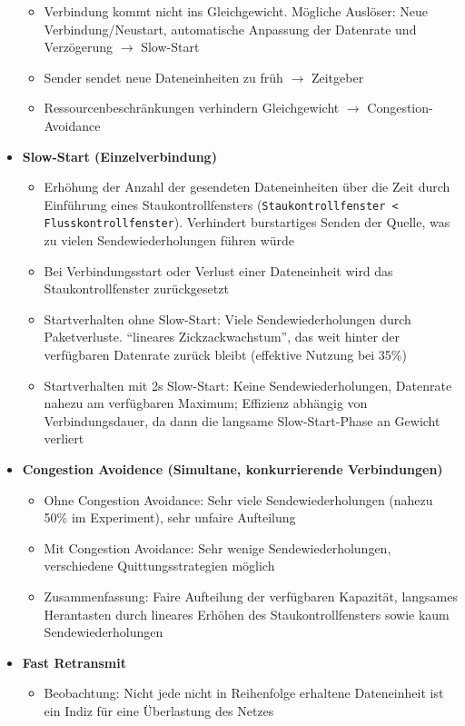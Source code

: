 \begin{itemize}
	\begin{itemize}
		\item Verbindung kommt nicht ins Gleichgewicht. Mögliche Auslöser: Neue Verbindung/Neustart, automatische Anpassung der Datenrate und Verzögerung \(\rightarrow\) Slow-Start
		\item Sender sendet neue Dateneinheiten zu früh \(\rightarrow\) Zeitgeber
		\item Ressourcenbeschränkungen verhindern Gleichgewicht \(\rightarrow\) Congestion-Avoidance
	\end{itemize}
	\item \textbf{Slow-Start (Einzelverbindung)}
	\begin{itemize}
		\item Erhöhung der Anzahl der gesendeten Dateneinheiten über die Zeit durch Einführung eines Staukontrollfensters (\texttt{Staukontrollfenster < Flusskontrollfenster}). Verhindert burstartiges Senden der Quelle, was zu vielen Sendewiederholungen führen würde
		\item Bei Verbindungsstart oder Verlust einer Dateneinheit wird das Staukontrollfenster zurückgesetzt
		\item Startverhalten ohne Slow-Start: Viele Sendewiederholungen durch Paketverluste. "`lineares Zickzackwachstum"', das weit hinter der verfügbaren Datenrate zurück bleibt (effektive Nutzung bei 35\%)
		\item Startverhalten mit 2s Slow-Start: Keine Sendewiederholungen, Datenrate nahezu am verfügbaren Maximum; Effizienz abhängig von Verbindungsdauer, da dann die langsame Slow-Start-Phase an Gewicht verliert
	\end{itemize}
	\item \textbf{Congestion Avoidence (Simultane, konkurrierende Verbindungen)}
	\begin{itemize}
		\item Ohne Congestion Avoidance: Sehr viele Sendewiederholungen (nahezu 50\% im Experiment), sehr unfaire Aufteilung
		\item Mit Congestion Avoidance: Sehr wenige Sendewiederholungen, verschiedene Quittungsstrategien möglich
		\item Zusammenfassung: Faire Aufteilung der verfügbaren Kapazität, langsames Herantasten durch lineares Erhöhen des Staukontrollfensters sowie kaum Sendewiederholungen
	\end{itemize}
	\item \textbf{Fast Retransmit}
	\begin{itemize}
		\item Beobachtung: Nicht jede nicht in Reihenfolge erhaltene Dateneinheit ist ein Indiz für eine Überlastung des Netzes

\end{itemize}
\end{itemize}
